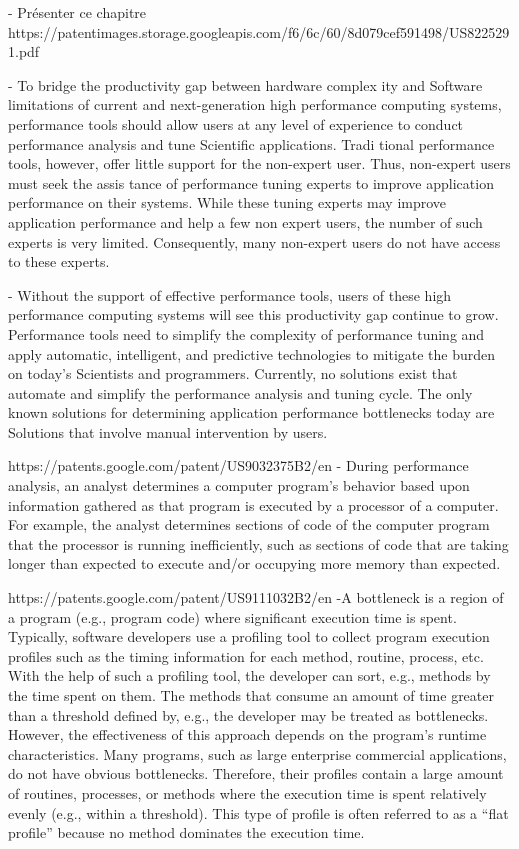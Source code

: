     - Présenter ce chapitre\\


https://patentimages.storage.googleapis.com/f6/6c/60/8d079cef591498/US8225291.pdf

    - To bridge the productivity gap between hardware complex ity and Software limitations of current and next-generation high performance computing systems, performance tools should allow users at any level of experience to conduct performance analysis and tune Scientific applications. Tradi tional performance tools, however, offer little support for the non-expert user. Thus, non-expert users must seek the assis tance of performance tuning experts to improve application performance on their systems. While these tuning experts may improve application performance and help a few non expert users, the number of such experts is very limited. Consequently, many non-expert users do not have access to these experts.
    
    - Without the support of effective performance tools, users of these high performance computing systems will see this productivity gap continue to grow. Performance tools need to simplify the complexity of performance tuning and apply automatic, intelligent, and predictive technologies to mitigate the burden on today's Scientists and programmers. Currently, no solutions exist that automate and simplify the performance analysis and tuning cycle. The only known solutions for determining application performance bottlenecks today are Solutions that involve manual intervention by users.
    
    
https://patents.google.com/patent/US9032375B2/en
    - During performance analysis, an analyst determines a computer program's behavior based upon information gathered as that program is executed by a processor of a computer. For example, the analyst determines sections of code of the computer program that the processor is running inefficiently, such as sections of code that are taking longer than expected to execute and/or occupying more memory than expected. 
    
    
https://patents.google.com/patent/US9111032B2/en  
    -A bottleneck is a region of a program (e.g., program code) where significant execution time is spent. Typically, software developers use a profiling tool to collect program execution profiles such as the timing information for each method, routine, process, etc. With the help of such a profiling tool, the developer can sort, e.g., methods by the time spent on them. The methods that consume an amount of time greater than a threshold defined by, e.g., the developer may be treated as bottlenecks. However, the effectiveness of this approach depends on the program's runtime characteristics. Many programs, such as large enterprise commercial applications, do not have obvious bottlenecks. Therefore, their profiles contain a large amount of routines, processes, or methods where the execution time is spent relatively evenly (e.g., within a threshold). This type of profile is often referred to as a “flat profile” because no method dominates the execution time.
    
